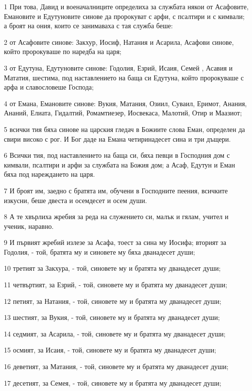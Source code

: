 \par 1 При това, Давид и военачалниците определиха за службата някои от Асафовите, Емановите и Едутуновите синове да пророкуват с арфи, с псалтири и с кимвали; а броят на ония, които се занимаваха с тая служба беше:
\par 2 от Асафовите синове: Закхур, Иосиф, Натания и Асарила, Асафови синове, който пророкуваше по наредба на царя;
\par 3 от Едутуна, Едутуновите синове: Годолия, Езрий, Исаия, Семей , Асавия и Мататия, шестима, под наставлението на баща си Едутуна, който пророкуваше с арфа и славословеше Господа;
\par 4 от Емана, Емановите синове: Вукия, Матания, Озиил, Суваил, Еримот, Анания, Ананий, Елиата, Гидалтий, Ромамтиезер, Иосвекаса, Малотий, Отир и Маазиот;
\par 5 всички тия бяха синове на царския гледач в Божиите слова Еман, определен да свири високо с рог. И Бог даде на Емана четиринадесет сина и три дъщери.
\par 6 Всички тия, под наставлението на баща си, бяха певци в Господния дом с кимвали, псалтири и арфи за службата на Божия дом; а Асаф, Едутун и Еман бяха под нареждането на царя.
\par 7 И броят им, заедно с братята им, обучени в Господните пеения, всичките изкусни, беше двеста и осемдесет и осем души.
\par 8 А те хвърлиха жребия за реда на служението си, малък и гялам, учител и ученик, наравно.
\par 9 И първият жребий излезе за Асафа, тоест за сина му Иосифа; вторият за Годолия, - той, братята му и синовете му бяха дванадесет души;
\par 10 третият за Закхура, - той, синовете му и братята му дванадесет души;
\par 11 четвъртият, за Езрий, - той, синовете му и братята му дванадесет души;
\par 12 петият, за Натания, - той, синовете му и братята му дванадесет души;
\par 13 шестият, за Вукия, - той, синовете му и братята му дванадесет души;
\par 14 седмият, за Асарила, - той, синовете му и братята му дванадесет души;
\par 15 осмият, за Исаия, - той, синовете му и братята му дванадесет души;
\par 16 деветият, за Матания, - той, синовете му и братята му дванадесет души;
\par 17 десетият, за Семея, - той, синовете му и братята му дванадесет души;
